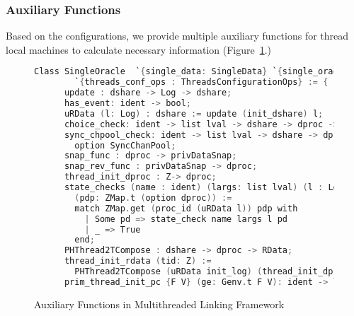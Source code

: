 \subsubsection{Auxiliary Functions}

Based on the configurations, we provide multiple auxiliary functions 
for thread local machines to calculate necessary information (Figure~\ref{fig:chapter:conlink:multithreaded-linking-aux-functions}.)
\begin{figure}
\begin{lstlisting}[language=C, morekeywords={Class}]
  Class SingleOracle  `{single_data: SingleData} `{single_oracle_ops : SingleOracleOps}  
        `{threads_conf_ops : ThreadsConfigurationOps} := {
      update : dshare -> Log -> dshare;
      has_event: ident -> bool;      
      uRData (l: Log) : dshare := update (init_dshare) l;      
      choice_check: ident -> list lval -> dshare -> dproc -> Z;
      sync_chpool_check: ident -> list lval -> dshare -> dproc ->
        option SyncChanPool;
      snap_func : dproc -> privDataSnap;
      snap_rev_func : privDataSnap -> dproc; 
      thread_init_dproc : Z-> dproc;
      state_checks (name : ident) (largs: list lval) (l : Log) 
        (pdp: ZMap.t (option dproc)) :=
        match ZMap.get (proc_id (uRData l)) pdp with 
          | Some pd => state_check name largs l pd
          | _ => True
        end;
      PHThread2TCompose : dshare -> dproc -> RData;      
      thread_init_rdata (tid: Z) :=
        PHThread2TCompose (uRData init_log) (thread_init_dproc tid);
      prim_thread_init_pc {F V} (ge: Genv.t F V): ident -> list lval -> option val }.
\end{lstlisting}
\caption{Auxiliary Functions in Multithreaded Linking Framework}
\label{fig:chapter:conlink:multithreaded-linking-aux-functions}
\end{figure}
